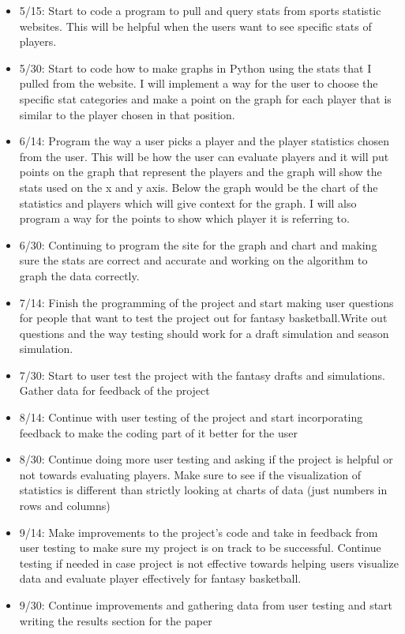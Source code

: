 \documentclass[10pt,twocolumn]{article}
\begin{document}
\begin{itemize}
    \item 5/15: Start to code a program to pull and query stats from sports statistic websites. This will be helpful when the users want to see specific stats of players.
    \item 5/30: Start to code how to make graphs in Python using the stats that I pulled from the website. I will implement a way for the user to choose the specific stat categories and make a point on the graph for each player that is similar to the player chosen in that position. 
    \item 6/14: Program the way a user picks a player and the player statistics chosen from the user. This will be how the user can evaluate players and it will put points on the graph that represent the players and the graph will show the stats used on the x and y axis. Below the graph would be the chart of the statistics and players which will give context for the graph. I will also program a way for the points to show which player it is referring to.
    \item 6/30: Continuing to program the site for the graph and chart and making sure the stats are correct and accurate and working on the algorithm to graph the data correctly. 
    \item 7/14: Finish the programming of the project and start making user questions for people that want to test the project out for fantasy basketball.Write out questions and the way testing should work for a draft simulation and season simulation.
    \item 7/30: Start to user test the project with the fantasy drafts and simulations. Gather data for feedback of the project
    \item 8/14: Continue with user testing of the project and start incorporating feedback to make the coding part of it better for the user
    \item 8/30: Continue doing more user testing and asking if the project is helpful or not towards evaluating players. Make sure to see if the visualization of statistics is different than strictly looking at charts of data (just numbers in rows and columns)
    \item 9/14: Make improvements to the project's code and take in feedback from user testing to make sure my project is on track to be successful. Continue testing if needed in case project is not effective towards helping users visualize data and evaluate player effectively for fantasy basketball.
    \item 9/30: Continue improvements and gathering data from user testing and start writing the results section for the paper

\end{itemize}
\end{document}
